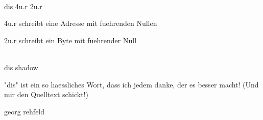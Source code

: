                                          
                                        
\\ dis 4u.r 2u.r                         
                                         
4u.r schreibt eine Adresse               
 mit fuehrenden Nullen                   
                                         
2u.r schreibt ein Byte                   
 mit fuehrender Null                     
                                         
                                         
                                         
                                         
                                         
                                         
                                         
                                         
                                         
                                         
                                         
                                         
                                         
                                         
                                         
                                         
                                         
                                        
\\ dis shadow                            
                                         
"dis" ist ein so haessliches Wort,       
dass ich jedem danke, der es besser      
macht! (Und mir den Quelltext schickt!)  
                                         
georg rehfeld                            
                                         
                                         
                                         
                                         
                                         
                                         
                                         
                                         
                                         
